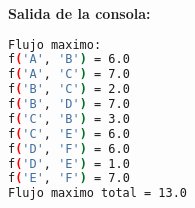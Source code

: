 \documentclass[12pt]{article}
\begin{document}
\textbf{Salida de la consola:}
\begin{lstlisting}[language=bash,backgroundcolor=\color{black},basicstyle=\color{white}\ttfamily,numbers=none]
Flujo maximo:
f('A', 'B') = 6.0
f('A', 'C') = 7.0
f('B', 'C') = 2.0
f('B', 'D') = 7.0
f('C', 'B') = 3.0
f('C', 'E') = 6.0
f('D', 'F') = 6.0
f('D', 'E') = 1.0
f('E', 'F') = 7.0
Flujo maximo total = 13.0
\end{lstlisting}
\end{document}
